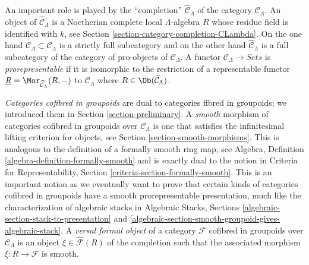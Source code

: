 \medskip\noindent
An important role is played by the ``completion''
$\widehat{\mathcal{C}}_\Lambda$ of the category $\mathcal{C}_\Lambda$.
An object of $\widehat{\mathcal{C}}_\Lambda$ is a Noetherian complete
local $\Lambda$-algebra $R$ whose residue field is identified with $k$, see
Section \ref{section-category-completion-CLambda}.
On the one hand $\mathcal{C}_\Lambda \subset \widehat{\mathcal{C}}_\Lambda$
is a strictly full subcategory and on the other hand
$\widehat{\mathcal{C}}_\Lambda$ is a full subcategory of the category
of pro-objects of $\mathcal{C}_\Lambda$. A functor
$\mathcal{C}_\Lambda \to \textit{Sets}$ is {\it prorepresentable}
if it is isomorphic to the restriction of a representable functor
$\underline{R} = \Mor_{\widehat{\mathcal{C}}_\Lambda}(R, -)$
to $\mathcal{C}_\Lambda$ where
$R \in \Ob(\widehat{\mathcal{C}}_\Lambda)$.

\medskip\noindent
{\it Categories cofibred in groupoids} are dual to categories fibred in
groupoids; we introduced them in Section \ref{section-preliminary}.
A {\it smooth} morphism of categories cofibred in groupoids over
$\mathcal{C}_\Lambda$ is one that satisfies the infinitesimal lifting
criterion for objects, see
Section \ref{section-smooth-morphisms}.
This is analogous to the definition of a formally smooth ring map, see
Algebra, Definition \ref{algebra-definition-formally-smooth}
and is exactly dual to the notion in
Criteria for Representability, Section \ref{criteria-section-formally-smooth}.
This is an important notion as we eventually want to prove that certain
kinds of categories cofibred in groupoids have a smooth prorepresentable
presentation, much like the characterization of algebraic stacks in
Algebraic Stacks, Sections \ref{algebraic-section-stack-to-presentation} and
\ref{algebraic-section-smooth-groupoid-gives-algebraic-stack}.
A {\it versal formal object} of a category $\mathcal{F}$ cofibred
in groupoids over $\mathcal{C}_\Lambda$ is an object
$\xi \in \widehat{\mathcal{F}}(R)$ of the completion such that the
associated morphism $\underline{\xi} : \underline{R} \to \mathcal{F}$
is smooth.


